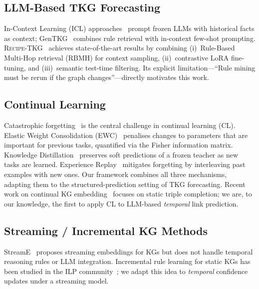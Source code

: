 \documentclass[10pt,twocolumn]{article}
\theoremstyle{definition}
\newcommand{\recipe}{\textsc{Recipe-TKG}}
\begin{document}
\subsection{LLM-Based TKG Forecasting}

In-Context Learning (ICL) approaches~\citep{Xiong2024icl} prompt frozen LLMs
with historical facts as context; GenTKG~\citep{Liao2024gentkg} combines
rule retrieval with in-context few-shot prompting.
\recipe{}~\citep{Akgul2025recipe} achieves state-of-the-art results by
combining (i)~Rule-Based Multi-Hop retrieval (RBMH) for context sampling,
(ii)~contrastive LoRA fine-tuning, and (iii)~semantic test-time filtering.
Its explicit limitation---``Rule mining must be rerun if the graph
changes''---directly motivates this work.

\subsection{Continual Learning}

Catastrophic forgetting~\citep{McCloskey1989catastrophic} is the central
challenge in continual learning (CL).
Elastic Weight Consolidation (EWC)~\citep{Kirkpatrick2017ewc} penalises
changes to parameters that are important for previous tasks, quantified via
the Fisher information matrix.
Knowledge Distillation~\citep{Hinton2015distillation} preserves soft
predictions of a frozen teacher as new tasks are learned.
Experience Replay~\citep{Robins1995replay} mitigates forgetting by
interleaving past examples with new ones.
Our framework combines all three mechanisms, adapting them to the
structured-prediction setting of TKG forecasting.
Recent work on continual KG embedding~\citep{Liu2021ckge} focuses on static
triple completion; we are, to our knowledge, the first to apply CL to
LLM-based \emph{temporal} link prediction.

\subsection{Streaming / Incremental KG Methods}

StreamE~\citep{Luo2023streame} proposes streaming embeddings for KGs but does
not handle temporal reasoning rules or LLM integration.
Incremental rule learning for static KGs has been studied in the ILP
community~\citep{Galárraga2013amie}; we adapt this idea to \emph{temporal}
confidence updates under a streaming model.

\end{document}
